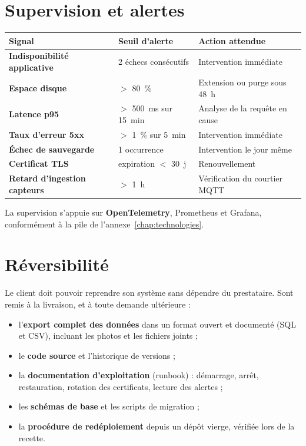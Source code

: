 \section{Supervision et alertes}
\begin{xltabular}{\textwidth}{>{\bfseries}p{4.2cm} p{3.4cm} X}
\toprule
\textbf{Signal} & \textbf{Seuil d'alerte} & \textbf{Action attendue} \\
\midrule
\endhead
Indisponibilité applicative & 2 échecs consécutifs & Intervention immédiate \\
Espace disque & $>$ 80~\% & Extension ou purge sous 48~h \\
Latence p95 & $>$ 500~ms sur 15~min & Analyse de la requête en cause \\
Taux d'erreur 5xx & $>$ 1~\% sur 5~min & Intervention immédiate \\
Échec de sauvegarde & 1 occurrence & Intervention le jour même \\
Certificat TLS & expiration $<$ 30~j & Renouvellement \\
Retard d'ingestion capteurs & $>$ 1~h & Vérification du courtier MQTT \\
\bottomrule
\end{xltabular}

La supervision s'appuie sur \textbf{OpenTelemetry}, Prometheus et Grafana,
conformément à la pile de l'annexe~\ref{chap:technologies}.

\section{Réversibilité}
Le client doit pouvoir reprendre son système sans dépendre du prestataire.
Sont remis à la livraison, et à toute demande ultérieure :

\begin{itemize}
  \item l'\textbf{export complet des données} dans un format ouvert et
        documenté (SQL et CSV), incluant les photos et les fichiers joints ;
  \item le \textbf{code source} et l'historique de versions ;
  \item la \textbf{documentation d'exploitation} (runbook) : démarrage, arrêt,
        restauration, rotation des certificats, lecture des alertes ;
  \item les \textbf{schémas de base} et les scripts de migration ;
  \item la \textbf{procédure de redéploiement} depuis un dépôt vierge, vérifiée
        lors de la recette.
\end{itemize}

